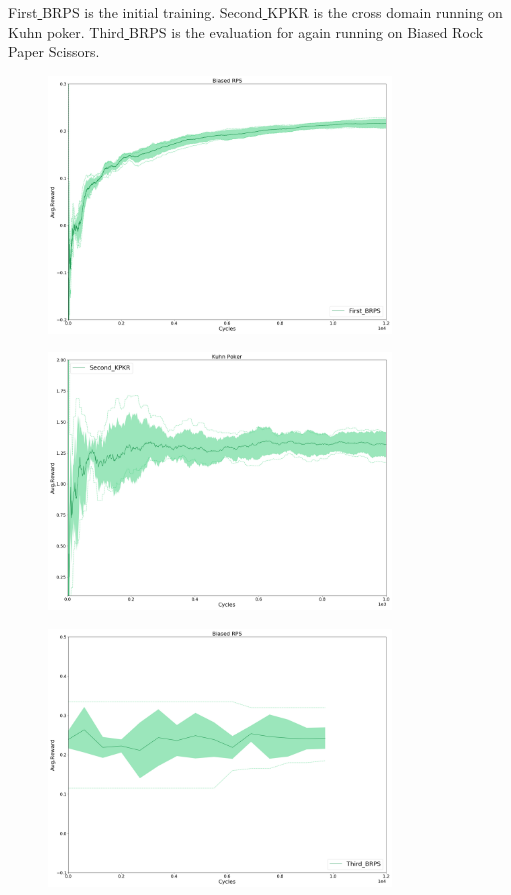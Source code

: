 \documentclass{article}
\theoremstyle{definition}
\newtheorem{primary statistics}[definition]{Primary Statistics}
\newtheorem{auxiliary statistics}[definition]{Auxiliary Statistics}
\begin{document}
First\underline{ }BRPS is the initial training. Second\underline{ }KPKR is the cross domain running on Kuhn poker. Third\underline{ }BRPS is the evaluation for again running on Biased Rock Paper Scissors.


 \begin{figure}[h]
 \centering
    \includegraphics[width=9.1cm]{First_BRPS}
\end{figure}

\begin{figure}[h]
 \centering
    \includegraphics[width=9.1cm]{Second_KPKR}
\end{figure}

\begin{figure}[h]
 \centering
    \includegraphics[width=9.1cm]{Third_BRPS}
\end{figure}
\end{document}
